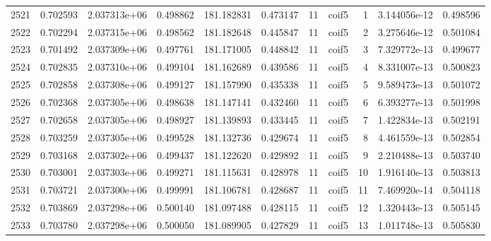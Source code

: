 \begin{tabular}{lrrrrrrlrrr}
2521 &    0.702593 &        2.037313e+06 &  0.498862 &              181.182831 &    0.473147 &      11 &        coif5 &      1 &   3.144056e-12 &      0.498596 \\
2522 &    0.702294 &        2.037315e+06 &  0.498562 &              181.182648 &    0.445847 &      11 &        coif5 &      2 &   3.275646e-12 &      0.501084 \\
2523 &    0.701492 &        2.037309e+06 &  0.497761 &              181.171005 &    0.448842 &      11 &        coif5 &      3 &   7.329772e-13 &      0.499677 \\
2524 &    0.702835 &        2.037310e+06 &  0.499104 &              181.162689 &    0.439586 &      11 &        coif5 &      4 &   8.331007e-13 &      0.500823 \\
2525 &    0.702858 &        2.037308e+06 &  0.499127 &              181.157990 &    0.435338 &      11 &        coif5 &      5 &   9.589473e-13 &      0.501072 \\
2526 &    0.702368 &        2.037305e+06 &  0.498638 &              181.147141 &    0.432460 &      11 &        coif5 &      6 &   6.393277e-13 &      0.501998 \\
2527 &    0.702658 &        2.037305e+06 &  0.498927 &              181.139893 &    0.433445 &      11 &        coif5 &      7 &   1.422834e-13 &      0.502191 \\
2528 &    0.703259 &        2.037305e+06 &  0.499528 &              181.132736 &    0.429674 &      11 &        coif5 &      8 &   4.461559e-13 &      0.502854 \\
2529 &    0.703168 &        2.037302e+06 &  0.499437 &              181.122620 &    0.429892 &      11 &        coif5 &      9 &   2.210488e-13 &      0.503740 \\
2530 &    0.703001 &        2.037303e+06 &  0.499271 &              181.115631 &    0.428978 &      11 &        coif5 &     10 &   1.916140e-13 &      0.503813 \\
2531 &    0.703721 &        2.037300e+06 &  0.499991 &              181.106781 &    0.428687 &      11 &        coif5 &     11 &   7.469920e-14 &      0.504118 \\
2532 &    0.703869 &        2.037298e+06 &  0.500140 &              181.097488 &    0.428115 &      11 &        coif5 &     12 &   1.320443e-13 &      0.505145 \\
2533 &    0.703780 &        2.037298e+06 &  0.500050 &              181.089905 &    0.427829 &      11 &        coif5 &     13 &   1.011748e-13 &      0.505830 \\

\end{tabular}
